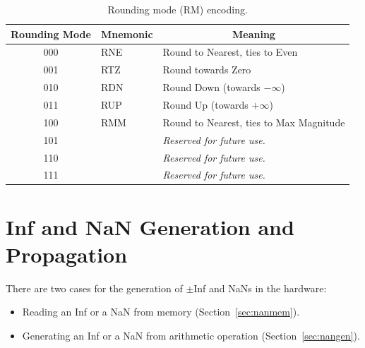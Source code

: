 \begin{table}[htbp]
    \begin{small}
    \begin{center}
    \begin{tabular}{ccl}
    \hline
    \multicolumn{1}{|c|}{Rounding Mode} &
    \multicolumn{1}{c|}{Mnemonic} &
    \multicolumn{1}{c|}{Meaning} \\
    \hline
    \multicolumn{1}{|c|}{000} &
    \multicolumn{1}{l|}{RNE} &
    \multicolumn{1}{l|}{Round to Nearest, ties to Even}\\
    \hline
    \multicolumn{1}{|c|}{001} &
    \multicolumn{1}{l|}{RTZ} &
    \multicolumn{1}{l|}{Round towards Zero}\\
    \hline
    \multicolumn{1}{|c|}{010} &
    \multicolumn{1}{l|}{RDN} &
    \multicolumn{1}{l|}{Round Down (towards $-\infty$)}\\
    \hline
    \multicolumn{1}{|c|}{011} &
    \multicolumn{1}{l|}{RUP} &
    \multicolumn{1}{l|}{Round Up (towards $+\infty$)}\\
    \hline
    \multicolumn{1}{|c|}{100} &
    \multicolumn{1}{l|}{RMM} &
    \multicolumn{1}{l|}{Round to Nearest, ties to Max Magnitude}\\
    \hline
    \multicolumn{1}{|c|}{101} &
    \multicolumn{1}{l|}{} &
    \multicolumn{1}{l|}{\em Reserved for future use.}\\
    \hline
    \multicolumn{1}{|c|}{110} &
    \multicolumn{1}{l|}{} &
    \multicolumn{1}{l|}{\em Reserved for future use.}\\
    \hline
    \multicolumn{1}{|c|}{111} &
    \multicolumn{1}{l|}{} &
    \multicolumn{1}{l|}{\em Reserved for future use.}\\
    \hline
    \end{tabular}
    \end{center}
    \end{small}
    \caption{Rounding mode (RM) encoding.}
    \label{rm}
\end{table}

\section{Inf and NaN Generation and Propagation}

There are two cases for the generation of $\pm$Inf and NaNs in the hardware:

\begin{itemize}[topsep=0pt]
    \item Reading an Inf or a NaN from memory (Section~\ref{sec:nanmem}).
    \item Generating an Inf or a NaN from arithmetic operation (Section~\ref{sec:nangen}).
\end{itemize}

